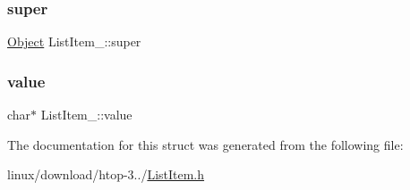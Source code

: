 \mbox{\label{structListItem___a95c71df8d8667df952c8be0e96539283}} 
\subsubsection{\texorpdfstring{super}{super}}
{\footnotesize\ttfamily \hyperlink{Object_8h_a32b67ad7134cd31b5ec5ed9c6a2d3978}{Object} List\+Item\+\_\+\+::super}

\mbox{\label{structListItem___a0dbf2fe4afa3a35a0b35eb4cbb471b20}} 
\subsubsection{\texorpdfstring{value}{value}}
{\footnotesize\ttfamily char$\ast$ List\+Item\+\_\+\+::value}



The documentation for this struct was generated from the following file\+:\begin{DoxyCompactItemize}
\item 
linux/download/htop-\/3../\hyperlink{ListItem_8h}{List\+Item.\+h}\end{DoxyCompactItemize}
